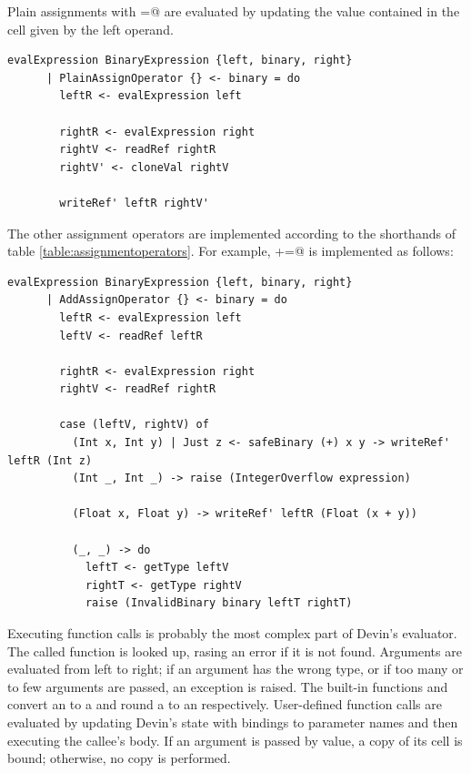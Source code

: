 \documentclass[UdineBachThesis,american,11pt,draft]{PhdThesis}
\begin{document}
  Plain assignments with \lstinline@=@ are evaluated by updating the value
  contained in the cell given by the left operand.

  \begin{lstlisting}[gobble=4,basicstyle=\ttfamily\small]
    evalExpression BinaryExpression {left, binary, right}
      | PlainAssignOperator {} <- binary = do
        leftR <- evalExpression left

        rightR <- evalExpression right
        rightV <- readRef rightR
        rightV' <- cloneVal rightV

        writeRef' leftR rightV'
  \end{lstlisting}

  The other assignment operators are implemented according to the shorthands of
  table \ref{table:assignmentoperators}. For example, \lstinline@+=@ is
  implemented as follows:

  \begin{lstlisting}[gobble=4,basicstyle=\ttfamily\small]
    evalExpression BinaryExpression {left, binary, right}
      | AddAssignOperator {} <- binary = do
        leftR <- evalExpression left
        leftV <- readRef leftR

        rightR <- evalExpression right
        rightV <- readRef rightR

        case (leftV, rightV) of
          (Int x, Int y) | Just z <- safeBinary (+) x y -> writeRef' leftR (Int z)
          (Int _, Int _) -> raise (IntegerOverflow expression)

          (Float x, Float y) -> writeRef' leftR (Float (x + y))

          (_, _) -> do
            leftT <- getType leftV
            rightT <- getType rightV
            raise (InvalidBinary binary leftT rightT)
  \end{lstlisting}

  Executing function calls is probably the most complex part of Devin's
  evaluator. The called function is looked up, rasing an error if it is not
  found. Arguments are evaluated from left to right; if an argument has the
  wrong type, or if too many or to few arguments are passed, an exception is
  raised. The built-in functions \lstinline@toFloat@ and \lstinline@toInt@
  convert an \lstinline@Int@ to a \lstinline@Float@ and round a
  \lstinline@Float@ to an \lstinline@Int@ respectively. User-defined function
  calls are evaluated by updating Devin's state with bindings to parameter names
  and then executing the callee's body. If an argument is passed by value, a
  copy of its cell is bound; otherwise, no copy is performed.
\end{document}
